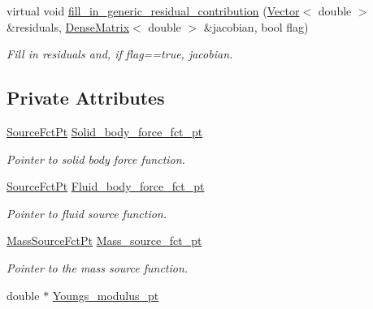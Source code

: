 \begin{DoxyCompactItemize}
virtual void \hyperlink{classoomph_1_1AxisymmetricPoroelasticityEquations_ab71a0b881d269e7dd0550003c50f6c3f}{fill\+\_\+in\+\_\+generic\+\_\+residual\+\_\+contribution} (\hyperlink{classoomph_1_1Vector}{Vector}$<$ double $>$ \&residuals, \hyperlink{classoomph_1_1DenseMatrix}{Dense\+Matrix}$<$ double $>$ \&jacobian, bool flag)
\begin{DoxyCompactList}\small\item\em Fill in residuals and, if flag==true, jacobian. \end{DoxyCompactList}\end{DoxyCompactItemize}
\subsection*{Private Attributes}
\begin{DoxyCompactItemize}
\item 
\hyperlink{classoomph_1_1AxisymmetricPoroelasticityEquations_a7a2c87557c3d9d405bb07a9f53bb4abe}{Source\+Fct\+Pt} \hyperlink{classoomph_1_1AxisymmetricPoroelasticityEquations_ad0e9513c61c00a3a98685e97484c31f5}{Solid\+\_\+body\+\_\+force\+\_\+fct\+\_\+pt}
\begin{DoxyCompactList}\small\item\em Pointer to solid body force function. \end{DoxyCompactList}\item 
\hyperlink{classoomph_1_1AxisymmetricPoroelasticityEquations_a7a2c87557c3d9d405bb07a9f53bb4abe}{Source\+Fct\+Pt} \hyperlink{classoomph_1_1AxisymmetricPoroelasticityEquations_a5e1e4b731368a93def0573d9a2732efd}{Fluid\+\_\+body\+\_\+force\+\_\+fct\+\_\+pt}
\begin{DoxyCompactList}\small\item\em Pointer to fluid source function. \end{DoxyCompactList}\item 
\hyperlink{classoomph_1_1AxisymmetricPoroelasticityEquations_a4f2fe2e03df9328898e9932b09299655}{Mass\+Source\+Fct\+Pt} \hyperlink{classoomph_1_1AxisymmetricPoroelasticityEquations_a829deae2bd08c180025b8caee64cc2b0}{Mass\+\_\+source\+\_\+fct\+\_\+pt}
\begin{DoxyCompactList}\small\item\em Pointer to the mass source function. \end{DoxyCompactList}\item 
double $\ast$ \hyperlink{classoomph_1_1AxisymmetricPoroelasticityEquations_a9fa087c7117862e74a3bac73303f7554}{Youngs\+\_\+modulus\+\_\+pt}

\end{DoxyCompactItemize}
